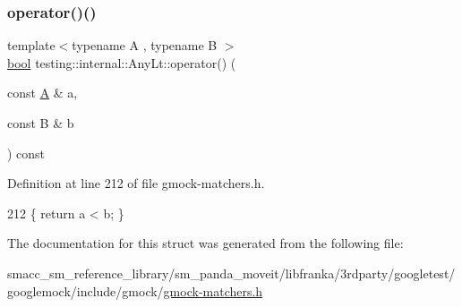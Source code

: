 \subsubsection{\texorpdfstring{operator()()}{operator()()}}
{\footnotesize\ttfamily template$<$typename A , typename B $>$ \\
\hyperlink{classbool}{bool} testing\+::internal\+::\+Any\+Lt\+::operator() (\begin{DoxyParamCaption}\item[{const \hyperlink{namespacetesting_a5e9134d655d2fc9323902348083282e7}{A} \&}]{a,  }\item[{const B \&}]{b }\end{DoxyParamCaption}) const\hspace{0.3cm}{\ttfamily [inline]}}



Definition at line 212 of file gmock-\/matchers.\+h.


\begin{DoxyCode}
212 \{ \textcolor{keywordflow}{return} a < b; \}
\end{DoxyCode}


The documentation for this struct was generated from the following file\+:\begin{DoxyCompactItemize}
\item 
smacc\+\_\+sm\+\_\+reference\+\_\+library/sm\+\_\+panda\+\_\+moveit/libfranka/3rdparty/googletest/googlemock/include/gmock/\hyperlink{gmock-matchers_8h}{gmock-\/matchers.\+h}\end{DoxyCompactItemize}
